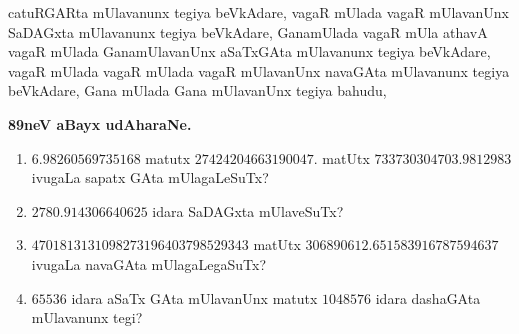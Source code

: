 catuRGARta mUlavanunx tegiya beVkAdare, vagaR mUlada vagaR mUlavanUnx SaDAGxta mUlavanunx tegiya beVkAdare, GanamUlada vagaR mUla athavA vagaR mUlada GanamUlavanUnx aSaTxGAta mUlavanunx tegiya beVkAdare, vagaR mUlada vagaR mUlada vagaR mUlavanUnx navaGAta mUlavanunx tegiya beVkAdare, Gana mUlada Gana mUlavanUnx tegiya bahudu,

\begin{center}
{\bf\large 89neV aBayx udAharaNe.}
\end{center}

\begin{enumerate}[\rm(1)]
\item $6.98260569735168$ matutx $27424204663190047.$ matUtx $733730304703.9812983$ ivugaLa sapatx GAta mUlagaLeSuTx?

\item $2780.914306640625$ idara SaDAGxta mUlaveSuTx?

\item $4701813131098273196403798529343$ matUtx $306890612.651583916787594637$ ivugaLa navaGAta mUlagaLegaSuTx?

\item $65536$ idara aSaTx GAta mUlavanUnx matutx $1048576$ idara dashaGAta mUlavanunx tegi?

\end{enumerate}
